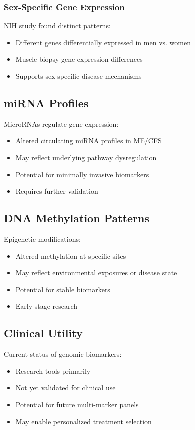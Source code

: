 \subsubsection{Sex-Specific Gene Expression}
NIH study found distinct patterns:
\begin{itemize}
    \item Different genes differentially expressed in men vs. women
    \item Muscle biopsy gene expression differences
    \item Supports sex-specific disease mechanisms
\end{itemize}

\subsection{miRNA Profiles}

MicroRNAs regulate gene expression:
\begin{itemize}
    \item Altered circulating miRNA profiles in ME/CFS
    \item May reflect underlying pathway dysregulation
    \item Potential for minimally invasive biomarkers
    \item Requires further validation
\end{itemize}

\subsection{DNA Methylation Patterns}

Epigenetic modifications:
\begin{itemize}
    \item Altered methylation at specific sites
    \item May reflect environmental exposures or disease state
    \item Potential for stable biomarkers
    \item Early-stage research
\end{itemize}

\subsection{Clinical Utility}

Current status of genomic biomarkers:
\begin{itemize}
    \item Research tools primarily
    \item Not yet validated for clinical use
    \item Potential for future multi-marker panels
    \item May enable personalized treatment selection
\end{itemize}

